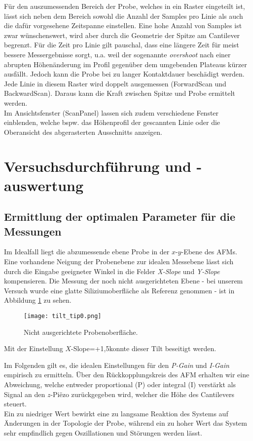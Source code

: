 Für den auszumessenden Bereich der Probe, welches in ein Raster eingeteilt ist, lässt sich neben dem Bereich sowohl die Anzahl der Samples pro Linie als auch die dafür vorgesehene Zeitspanne einstellen. Eine hohe Anzahl von Samples ist zwar wünschenswert, wird aber durch die Geometrie der Spitze am Cantilever begrenzt. Für die Zeit pro Linie gilt pauschal, dass eine längere Zeit für meist bessere Messergebnisse sorgt, u.a. weil der sogenannte \emph{overshoot} nach einer abrupten Höhenänderung im Profil gegenüber dem umgebenden Plateaus kürzer ausfällt. Jedoch kann die Probe bei zu langer Kontaktdauer beschädigt werden.\\
Jede Linie in diesem Raster wird doppelt ausgemessen (ForwardScan und BackwardScan). Daraus kann die Kraft zwischen Spitze und Probe ermittelt werden.\\
Im Ansichtsfenster (ScanPanel) lassen sich zudem verschiedene Fenster einblenden, welche bspw. das Höhenprofil der gescannten Linie oder die Oberansicht des abgerasterten Ausschnitts anzeigen.
\section{Versuchsdurchführung und -auswertung} 
\subsection{Ermittlung der optimalen Parameter für die Messungen}
Im Idealfall liegt die abzumessende ebene Probe in der $x$-$y$-Ebene des AFMs. Eine vorhandene Neigung der Probenebene zur idealen Messebene lässt sich durch die Eingabe geeigneter Winkel in die Felder \emph{X-Slope} und \emph{Y-Slope} kompensieren. Die Messung der noch nicht ausgerichteten Ebene - bei unserem Versuch wurde eine glatte Siliziumoberfläche %
als Referenz genommen - ist in Abbildung \ref{fig:tilt} zu sehen.
\begin{figure}[h]
	\centering
	\texttt{[image: tilt\_tip0.png]}
	\caption{Nicht ausgerichtete Probenoberfläche.}
	\label{fig:tilt}
\end{figure}
Mit der Einstellung $X$-Slope=+1,5\degree konnte dieser Tilt beseitigt werden.

Im Folgenden gilt es, die idealen Einstellungen für den \emph{P-Gain} und \emph{I-Gain} empirisch zu ermitteln. Über den Rückkopplungskreis des AFM erhalten wir eine Abweichung, welche entweder proportional (P) oder integral (I) verstärkt als Signal an den $z$-Pi\"{e}zo zurückgegeben wird, welcher die Höhe des Cantilevers steuert.\\
Ein zu niedriger Wert bewirkt eine zu langsame Reaktion des Systems auf Änderungen in der Topologie der Probe, während ein zu hoher Wert das System sehr empfindlich gegen Oszillationen und Störungen werden lässt.

